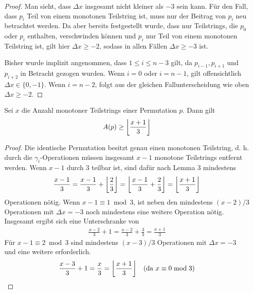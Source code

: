 \documentclass[a4paper, 10pt, ngerman]{article}
\begin{document}
\begin{proof}
    \noindent Man sieht, dass $\Delta x$ insgesamt nicht kleiner als $-3$ sein kann. Für den Fall, dass $p_i$ Teil von einem monotonen Teilstring ist, muss nur der Beitrag von $p_i$ neu betrachtet werden. Da aber bereits festgestellt wurde, dass nur Teilstrings, die $p_0$ oder $p_i$ enthalten, verschwinden können und $p_i$ nur Teil von einem monotonen Teilstring ist, gilt hier $\Delta x \ge -2$, sodass in allen Fällen $\Delta x \ge - 3$ ist.

    Bisher wurde implizit angenommen, dass $1 \le i \le n - 3$ gilt, da $p_{i-1}, p_{i + 1}$ und $p_{i + 2}$ in Betracht gezogen wurden. Wenn $i = 0$ oder $i = n - 1$, gilt offensichtlich $\Delta x \in \{0, -1\}$. Wenn $i = n - 2$, folgt aus der gleichen Fallunterscheidung wie oben $\Delta x \ge -2$.
\end{proof}

\begin{theorem}
    Sei $x$ die Anzahl monotoner Teilstrings einer Permutation $p$. Dann gilt
    $$ A(p) \ge \bigg{\lfloor} \frac {x + 1} 3 \bigg{\rfloor} $$
\end{theorem}

\begin{proof}
    Die identische Permutation besitzt genau einen monotonen Teilstring, d. h. durch die $\gamma_i$-Operationen müssen insgesamt $x - 1$ monotone Teilstrings entfernt werden. Wenn $x - 1$ durch 3 teilbar ist, sind dafür nach Lemma 3 mindestens
    \begin{align*}
        \frac {x - 1} 3 = \frac {x - 1} 3 + \bigg{\lfloor} \frac 2 3 \bigg{\rfloor}
        = \bigg{\lfloor} \frac {x - 1} 3 + \frac 2 3 \bigg{\rfloor} =
        \bigg{\lfloor} \frac {x + 1} 3 \bigg{\rfloor}
    \end{align*}
    Operationen nötig. Wenn $x - 1 \equiv 1 \bmod 3$, ist neben den mindestens $(x - 2)/3$ Operationen mit $\Delta x = -3$ noch mindestens eine weitere Operation nötig. Insgesamt ergibt sich eine Unterschranke von
    \begin{align*}
        \frac {x - 2} 3 + 1 = \frac {x - 2} 3 + \frac 3 3 = \frac {x + 1} 3
    \end{align*}
    Für $x - 1 \equiv 2 \bmod 3$ sind mindestens $(x - 3) / 3$ Operationen mit $\Delta x = -3$ und eine weitere erforderlich.
    \begin{align*}
        \frac {x - 3} 3 + 1 = \frac x 3 = \bigg{\lfloor} \frac {x + 1} 3 \bigg{\rfloor} \quad (\text{da } x \equiv 0 \bmod 3)
    \end{align*}
\end{proof}
\end{document}
